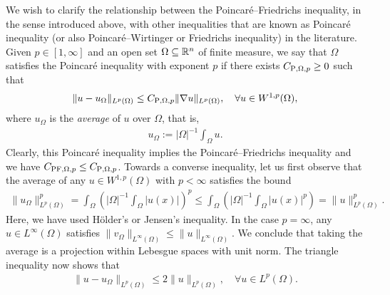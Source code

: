 \documentclass[12pt,a4paper]{article}
\begin{document}
We wish to clarify the relationship between the Poincar\'e--Friedrichs inequality, in the sense introduced above, with other inequalities that are known as Poincar\'e inequality (or also Poincar\'e--Wirtinger or Friedrichs inequality) in the literature. Given $p \in [1,\infty]$ and an open set $\Omega \subseteq {\mathbb R}^{n}$ of finite measure, %
we say that $\Omega$ satisfies the Poincar\'e inequality with exponent $p$ 
if there exists $C_{{{\rm P}},\Omega,p} \geq 0$ such that 
\begin{align}
    \| u - u_{\Omega} \|_{L^{p}(\Omega)}
    \leq 
    C_{{\rm P},\Omega,p} 
    \| \nabla u \|_{L^{p}(\Omega)}
    ,
    \quad 
    \forall u \in W^{1,p}(\Omega)
    ,
\end{align}
where $u_{\Omega}$ is the \emph{average} of $u$ over $\Omega$, that is,
\begin{align*}
    u_{\Omega} := |\Omega|^{-1} \int_{\Omega} u.
\end{align*}
Clearly, this Poincar\'e inequality implies the Poincar\'e--Friedrichs inequality and we have $C_{{\rm{PF}},\Omega,p} \leq C_{{\rm P},\Omega,p}$. 
Towards a converse inequality, 
let us first observe that the average of any $u \in W^{1,p}(\Omega)$ with $p < \infty$ satisfies the bound 
\begin{align*}
    \| u_\Omega \|_{L^{p}(\Omega)}^{p}
    = 
    \int_{\Omega} \left( |\Omega|^{-1} \int_{\Omega} |u(x)| \right)^{p}
    \leq 
    \int_{\Omega} \left( |\Omega|^{-1} \int_{\Omega} |u(x)|^{p} \right)
    = 
    \| u \|_{L^{p}(\Omega)}^{p}
    .
\end{align*}
Here, we have used H\"older's or Jensen's inequality. 
In the case $p = \infty$, any $u \in L^{\infty}(\Omega)$ satisfies $\| v_\Omega \|_{L^{\infty}(\Omega)} \leq \| u \|_{L^{\infty}(\Omega)}$. 
We conclude that taking the average is a projection within Lebesgue spaces with unit norm. 
The triangle inequality now shows that 
\begin{align*}
    \| u - u_\Omega \|_{L^{p}(\Omega)} 
    \leq
    2
    \| u \|_{L^{p}(\Omega)},
    \quad 
    \forall
    u \in L^{p}(\Omega)
    .
\end{align*}
\end{document}
